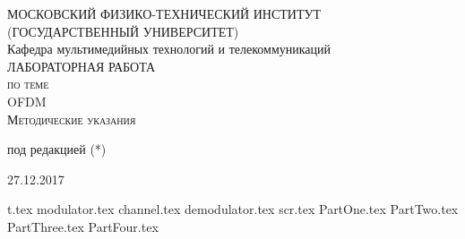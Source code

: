 \documentclass[a4paper,12pt]{article}
\begin{document}

\begin{titlepage}
  \begin{center}
    \large
    МОСКОВСКИЙ ФИЗИКО-ТЕХНИЧЕСКИЙ ИНСТИТУТ\\ (ГОСУДАРСТВЕННЫЙ УНИВЕРСИТЕТ)\\[60mm]
   
    
 
    Кафедра мультимедийных технологий и телекоммуникаций\\[5mm]
 
    \textsc{ЛАБОРАТОРНАЯ РАБОТА \\ по теме  }\\[5mm]
     
    {\LARGE OFDM}\\[6mm]
     \textsc{Методические указания }\\[100mm]
  \bigskip
     
      
	\begin{center}

 	 под редакцией (*)

	\end{center}
    
\end{center}

\begin{center}

 27.12.2017

\end{center}
\end{titlepage}

\tableofcontents
\newpage

{t.tex}
\newpage
{modulator.tex}
\newpage
{channel.tex}
\newpage
{demodulator.tex}
\newpage
{scr.tex}
\newpage
{PartOne.tex}
\newpage
{PartTwo.tex}
\newpage
{PartThree.tex}
\newpage
{PartFour.tex}
\end{document}
